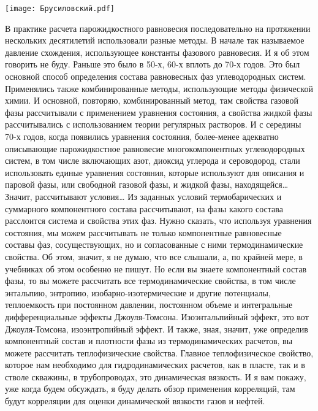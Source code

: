 \documentclass[main.tex]{subfiles}
\begin{document}
\begin{center}
\texttt{[image: Брусиловский.pdf]}
\end{center}

В практике расчета парожидкостного равновесия последовательно на протяжении нескольких десятилетий использовали разные методы.
В начале так называемое давление схождения, использующее константы фазового равновесия.
И я об этом говорить не буду.
Раньше это было в 50-х, 60-х вплоть до 70-х годов.
Это был основной способ определения состава равновесных фаз углеводородных систем.
Применялись также комбинированные методы, использующие методы физической химии.
И основной, повторяю, комбинированный метод, там свойства газовой фазы рассчитывали с применением уравнения состояния, а свойства жидкой фазы рассчитывались с использованием теории регулярных растворов.
И с середины 70-х годов, когда появились уравнения состояния, более-менее адекватно описывающие парожидкостное равновесие многокомпонентных углеводородных систем, в том числе включающих азот, диоксид углерода и сероводород, стали использовать единые уравнения состояния, которые используют для описания и паровой фазы, или свободной газовой фазы, и жидкой фазы, находящейся…
Значит, рассчитывают условия…
Из заданных условий термобарических и суммарного компонентного состава рассчитывают, на фазы какого состава расслоится система и свойства этих фаз.
Нужно сказать, что используя уравнения состояния, мы можем рассчитывать не только компонентные равновесные составы фаз, сосуществующих, но и согласованные с ними термодинамические свойства.
Об этом, значит, я не думаю, что все слышали, а, по крайней мере, в учебниках об этом особенно не пишут.
Но если вы знаете компонентный состав фазы, то вы можете рассчитать все термодинамические свойства, в том числе энтальпию, энтропию, изобарно-изотермические и другие потенциалы, теплоемкость при постоянном давлении, постоянном объеме и интегральные дифференциальные эффекты Джоуля-Томсона.
Изоэнтальпийный эффект, это вот Джоуля-Томсона, изоэнтропийный эффект.
И также, зная, значит, уже определив компонентный состав и плотности фазы из термодинамических расчетов, вы можете рассчитать теплофизические свойства.
Главное теплофизическое свойство, которое нам необходимо для гидродинамических расчетов, как в пласте, так и в стволе скважины, в трубопроводах, это динамическая вязкость.
И я вам покажу, уже когда будем обсуждать, я буду делать обзор применения корреляций, там будут корреляции для оценки динамической вязкости газов и нефтей.
\end{document}
